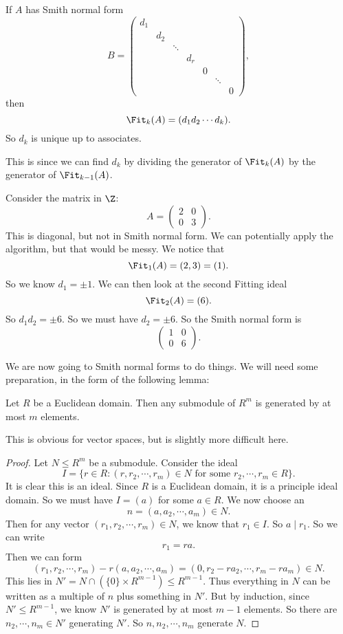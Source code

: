 \documentclass[a4paper]{article}
\begin{document}
\begin{cor}
  If $A$ has Smith normal form
  \[
    B =
    \begin{pmatrix}
      d_1\\
      & d_2\\
      & & \ddots\\
      & & & d_r\\
      & & & & 0\\
      & & & & & \ddots\\
      & & & & & & 0
    \end{pmatrix},
  \]
  then
  \[
    \Fit_k(A) = (d_1 d_2 \cdots d_k).
  \]
  So $d_k$ is unique up to associates.
\end{cor}
This is since we can find $d_k$ by dividing the generator of $\Fit_k(A)$ by the generator of $\Fit_{k - 1}(A)$.

\begin{eg}
  Consider the matrix in $\Z$:
  \[
    A = \begin{pmatrix}
      2 & 0\\
      0 & 3
    \end{pmatrix}.
  \]
  This is diagonal, but not in Smith normal form. We can potentially apply the algorithm, but that would be messy. We notice that
  \[
    \Fit_1(A) = (2, 3) = (1).
  \]
  So we know $d_1 = \pm 1$. We can then look at the second Fitting ideal
  \[
    \Fit_2(A) = (6).
  \]
  So $d_1 d_2 = \pm 6$. So we must have $d_2 = \pm 6$. So the Smith normal form is
  \[
    \begin{pmatrix}
      1 & 0\\
      0 & 6
    \end{pmatrix}.
  \]
\end{eg}

We are now going to Smith normal forms to do things. We will need some preparation, in the form of the following lemma:
\begin{lemma}
  Let $R$ be a Euclidean domain. Then any submodule of $R^m$ is generated by at most $m$ elements.
\end{lemma}
This is obvious for vector spaces, but is slightly more difficult here.

\begin{proof}
  Let $N \leq R^m$ be a submodule. Consider the ideal
  \[
    I = \{r \in R: (r, r_2, \cdots, r_m) \in N\text{ for some }r_2, \cdots, r_m \in R\}.
  \]
  It is clear this is an ideal. Since $R$ is a Euclidean domain, it is a principle ideal domain. So we must have $I = (a)$ for some $a \in R$. We now choose an
  \[
    n = (a, a_2, \cdots, a_m) \in N.
  \]
  Then for any vector $(r_1, r_2, \cdots, r_m) \in N$, we know that $r_1 \in I$. So $a \mid r_1$. So we can write
  \[
    r_1 = ra.
  \]
  Then we can form
  \[
    (r_1, r_2, \cdots, r_m) - r(a, a_2, \cdots, a_m) = (0, r_2 - ra_2, \cdots, r_m - r a_m)\in N.
  \]
  This lies in $N' = N \cap (\{0\} \times R^{m - 1}) \leq R^{m - 1}$. Thus everything in $N$ can be written as a multiple of $n$ plus something in $N'$. But by induction, since $N' \leq R^{m - 1}$, we know $N'$ is generated by at most $m - 1$ elements. So there are $n_2, \cdots, n_m \in N'$ generating $N'$. So $n, n_2, \cdots, n_m$ generate $N$.
\end{proof}
\end{document}
